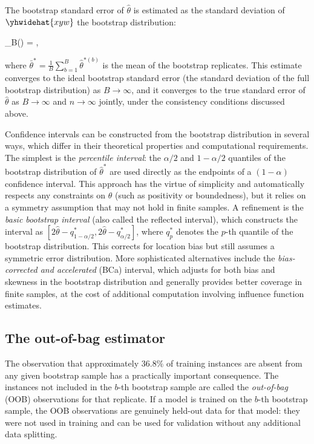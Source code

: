 The bootstrap standard error of $\hat{\theta}$ is estimated as the standard deviation of $\yhwidehat{xyw}$
the bootstrap distribution:
\begin{myequation}
_B(\hat{\theta}) = ,
\end{myequation}
where $\bar{\theta}^* = \frac{1}{B} \sum_{b=1}^B \hat{\theta}^{*(b)}$ is the mean of the
bootstrap replicates. This estimate converges to the ideal bootstrap standard error (the
standard deviation of the full bootstrap distribution) as $B \to \infty$, and it converges
to the true standard error of $\hat{\theta}$ as $B \to \infty$ and $n \to \infty$ jointly,
under the consistency conditions discussed above.

Confidence intervals can be constructed from the bootstrap distribution in several ways,
which differ in their theoretical properties and computational requirements. The simplest is
the \emph{percentile interval}: the $\alpha/2$ and $1 - \alpha/2$ quantiles of the
bootstrap distribution of $\hat{\theta}^*$ are used directly as the endpoints of a
$(1-\alpha)$ confidence interval. This approach has the virtue of simplicity and
automatically respects any constraints on $\theta$ (such as positivity or boundedness), but
it relies on a symmetry assumption that may not hold in finite samples. A refinement is the
\emph{basic bootstrap interval} (also called the reflected interval), which constructs the
interval as $[2\hat{\theta} - q_{1-\alpha/2}^*, 2\hat{\theta} - q_{\alpha/2}^*]$, where
$q_p^*$ denotes the $p$-th quantile of the bootstrap distribution. This corrects for
location bias but still assumes a symmetric error distribution. More sophisticated
alternatives include the \emph{bias-corrected and accelerated} (BCa) interval, which adjusts
for both bias and skewness in the bootstrap distribution and generally provides better
coverage in finite samples, at the cost of additional computation involving influence
function estimates.

\subsection*{The out-of-bag estimator}

The observation that approximately $36.8\%$ of training instances are absent from any given
bootstrap sample has a practically important consequence. The instances not included in the
$b$-th bootstrap sample are called the \emph{out-of-bag} (OOB) observations for that
replicate. If a model is trained on the $b$-th bootstrap sample, the OOB observations are
genuinely held-out data for that model: they were not used in training and can be used for
validation without any additional data splitting.

